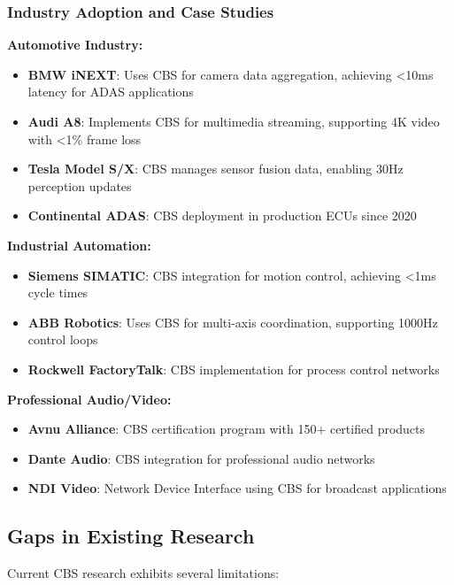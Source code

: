 \documentclass[10pt, journal, compsoc]{IEEEtran}
\begin{document}
\subsubsection{Industry Adoption and Case Studies}

\textbf{Automotive Industry:}
\begin{itemize}
    \item \textbf{BMW iNEXT}: Uses CBS for camera data aggregation, achieving <10ms latency for ADAS applications
    \item \textbf{Audi A8}: Implements CBS for multimedia streaming, supporting 4K video with <1\% frame loss
    \item \textbf{Tesla Model S/X}: CBS manages sensor fusion data, enabling 30Hz perception updates
    \item \textbf{Continental ADAS}: CBS deployment in production ECUs since 2020
\end{itemize}

\textbf{Industrial Automation:}
\begin{itemize}
    \item \textbf{Siemens SIMATIC}: CBS integration for motion control, achieving <1ms cycle times
    \item \textbf{ABB Robotics}: Uses CBS for multi-axis coordination, supporting 1000Hz control loops
    \item \textbf{Rockwell FactoryTalk}: CBS implementation for process control networks
\end{itemize}

\textbf{Professional Audio/Video:}
\begin{itemize}
    \item \textbf{Avnu Alliance}: CBS certification program with 150+ certified products
    \item \textbf{Dante Audio}: CBS integration for professional audio networks
    \item \textbf{NDI Video}: Network Device Interface using CBS for broadcast applications
\end{itemize}

\subsection{Gaps in Existing Research}

Current CBS research exhibits several limitations:
\end{document}
